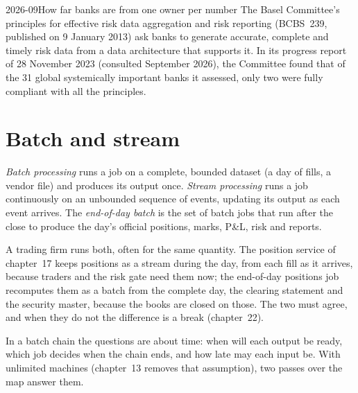 \label{lst:pl:the-platform-map:validate}

\begin{dated}{2026-09}{How far banks are from one owner per number}\label{dat:pl:the-platform-map:bcbs}
The Basel Committee's principles for effective risk data aggregation and risk reporting (BCBS~239, published on 9 January 2013)
ask banks to generate accurate, complete and timely risk data from a data architecture that supports it. In its progress
report of 28 November 2023 (consulted September 2026), the Committee found that of the 31 global systemically important banks
it assessed, only two were fully compliant with all the principles.
\end{dated}

\section{Batch and stream}

\begin{definition}\label{def:pl:the-platform-map:batch}
\emph{Batch processing} runs a job on a complete, bounded dataset (a day of fills, a vendor file) and
produces its output once. \emph{Stream processing} runs a job continuously on an unbounded sequence
of events, updating its output as each event arrives. The \emph{end-of-day batch} is the set of batch
jobs that run after the close to produce the day's official positions, marks, P\&L, risk and reports.
\end{definition}

A trading firm runs both, often for the same quantity. The position service of chapter~17 keeps positions as a stream during
the day, from each fill as it arrives, because traders and the risk gate need them now; the end-of-day positions job recomputes
them as a batch from the complete day, the clearing statement and the security master, because the books are closed on those.
The two must agree, and when they do not the difference is a break (chapter~22).

In a batch chain the questions are about time: when will each output be ready, which job decides when the chain ends, and how
late may each input be. With unlimited machines (chapter~13 removes that assumption), two passes over the map answer them.


